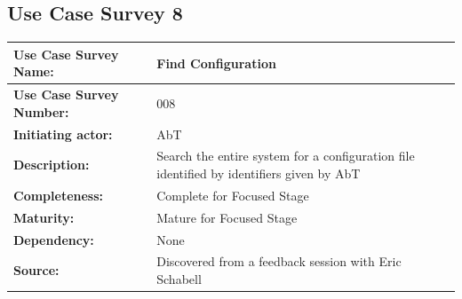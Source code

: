 \subsection{Use Case Survey 8}

\begin{center}
\begin{tabularx}{\linewidth}{|l|p{7.08cm}|}
\hline
\textbf{Use Case Survey Name:} & Find Configuration \\
\hline
\textbf{Use Case Survey Number:} & 008 \\
\hline
\textbf{Initiating actor:} & AbT \\
\hline
\textbf{Description:} & Search the entire system for a configuration file identified by identifiers given by AbT \\
\hline
\textbf{Completeness:} & Complete for Focused Stage \\
\hline
\textbf{Maturity:} & Mature for Focused Stage \\
\hline
\textbf{Dependency:} & None \\
\hline
\textbf{Source:} & Discovered from a feedback session with Eric Schabell \\
\hline
\end{tabularx}
\end{center}
